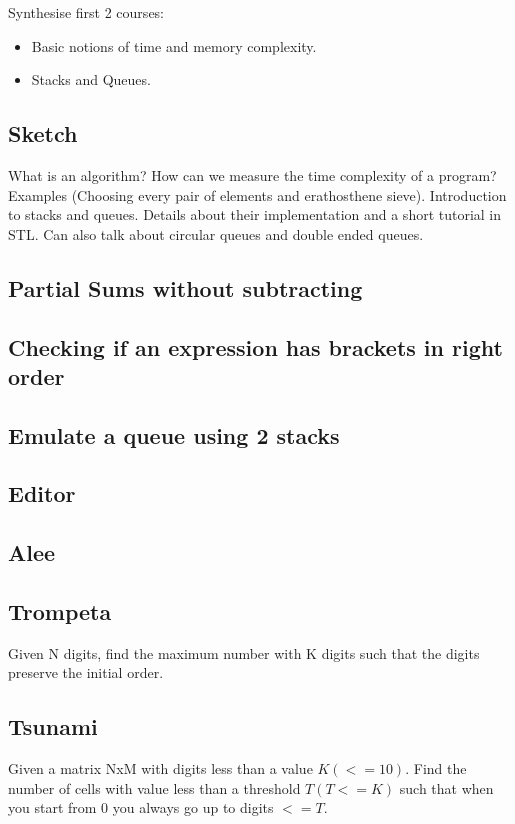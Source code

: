 \documentclass{llncs}
\begin{document}
Synthesise first 2 courses:
\begin{itemize}
	\item Basic notions of time and memory complexity.
	\item Stacks and Queues.
\end{itemize}

\subsection{Sketch}
	What is an algorithm? How can we measure the time complexity of a program? Examples (Choosing every pair of elements and erathosthene sieve).
	Introduction to stacks and queues. Details about their implementation and a short tutorial in STL. Can also talk about circular queues and double ended queues.

\subsection{Partial Sums without subtracting}

\subsection{Checking if an expression has brackets in right order}

\subsection{Emulate a queue using 2 stacks}

\subsection{Editor \cite{website:infoarena/editor}}

\subsection{Alee \cite{website:infoarena/alee}}

\subsection{Trompeta \cite{website:infoarena/trompeta}}
Given N digits, find the maximum number with K digits such that the digits preserve the initial order.

\subsection{Tsunami \cite{website:infoarena/tsunami}}
Given a matrix NxM with digits less than a value $K (<= 10)$. Find the number of cells with value less than a threshold $T (T <= K)$ such that when you start from 0 you always go up to digits $<= T$.
\end{document}
